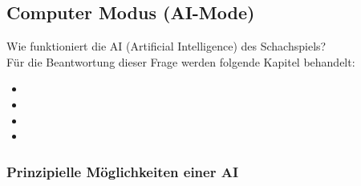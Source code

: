 \documentclass[12pt,a4paper]{article}
\begin{document}
{\subsection{Computer Modus (AI-Mode)}
\label{SUBSEC:AI-MODE}

Wie funktioniert die AI (Artificial Intelligence) des Schachspiels? \\
Für die Beantwortung dieser Frage werden folgende Kapitel behandelt:

\begin{itemize}
	\item{}
	\item{}
	\item{}
	\item{}
\end{itemize}



\subsubsection{Prinzipielle Möglichkeiten einer AI}
\label{SUBSUBSEC:GenAI}

}
\end{document}
